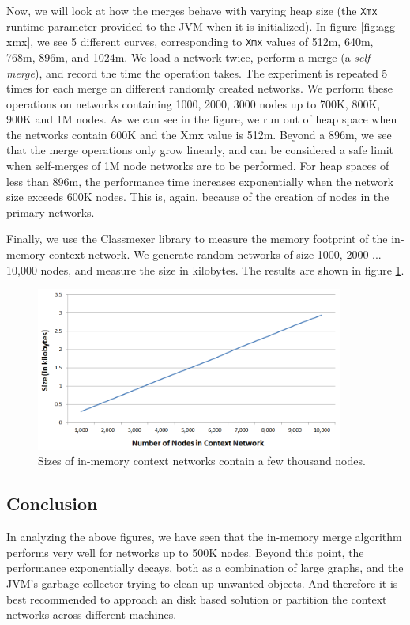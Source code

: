 Now, we will look at how the merges behave with varying heap size (the \texttt{Xmx} runtime parameter provided to the JVM when it is initialized). In figure \ref{fig:agg-xmx}, we see 5 different curves, corresponding to \texttt{Xmx} values of 512m, 640m, 768m, 896m, and 1024m. We load a network twice, perform a merge (a \textit{self-merge}), and record the time the operation takes. The experiment is repeated 5 times for each merge on different randomly created networks. We perform these operations on networks containing 1000, 2000, 3000 nodes up to 700K, 800K, 900K and 1M nodes. As we can see in the figure, we run out of heap space when the networks contain 600K and the Xmx value is 512m. Beyond a 896m, we see that the merge operations only grow linearly, and can be considered a safe limit when self-merges of 1M node networks are to be performed. For heap spaces of less than 896m, the performance time increases exponentially when the network size exceeds 600K nodes. This is, again, because of the creation of nodes in the primary networks.

Finally, we use the Classmexer library \cite{classmexer} to measure the memory footprint of the in-memory context network. We generate random networks of size 1000, 2000 ... 10,000 nodes, and measure the size in kilobytes. The results are shown in figure \ref{fig:sizes}.

\begin{figure}[t]
\centering
\includegraphics[width=0.9\textwidth]{media/chapter5/axis/perf/size-tree-1000.png}
\caption{Sizes of in-memory context networks contain a few thousand nodes.}
\label{fig:sizes}
\end{figure}


\subsection{Conclusion}

In analyzing the above figures, we have seen that the in-memory merge algorithm performs very well for networks up to 500K nodes. Beyond this point, the performance exponentially decays, both as a combination of large graphs, and the JVM's garbage collector trying to clean up unwanted objects. And therefore it is best recommended to approach an disk based solution or partition the context networks across different machines. 

